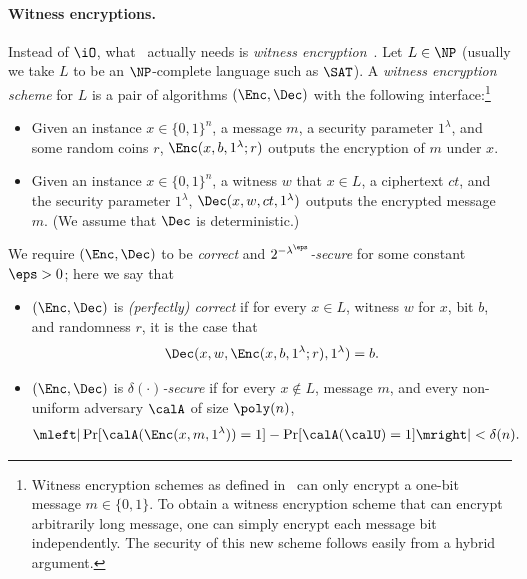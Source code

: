 \paragraph{Witness encryptions.} Instead of $\iO$, what~\cite{DBLP:conf/stoc/IlangoLW23} actually needs is \emph{witness encryption}~\cite{GargGSW13}. Let $L\in \NP$ (usually we take $L$ to be an $\NP$-complete language such as $\SAT$). A \emph{witness encryption scheme} for $L$ is a pair of algorithms $(\Enc, \Dec)$ with the following interface:\footnote{Witness encryption schemes as defined in~\cite{GargGSW13} can only encrypt a one-bit message $m\in \{0, 1\}$. To obtain a witness encryption scheme that can encrypt arbitrarily long message, one can simply encrypt each message bit independently. The security of this new scheme follows easily from a hybrid argument.}
\begin{itemize}
	\item Given an instance $x \in \{0, 1\}^n$, a message $m$, a security parameter $1^\lambda$, and some random coins $r$, $\Enc(x, b, 1^\lambda; r)$ outputs the encryption of $m$ under $x$.
	\item Given an instance $x \in \{0, 1\}^n$, a witness $w$ that $x\in L$, a ciphertext $ct$, and the security parameter $1^\lambda$, $\Dec(x, w, ct, 1^\lambda)$ outputs the encrypted message $m$. (We assume that $\Dec$ is deterministic.)
\end{itemize}

We require $(\Enc, \Dec)$ to be \emph{correct} and \emph{$2^{-\lambda^\eps}$-secure} for some constant $\eps > 0$; here we say that
\begin{itemize}
    \item $(\Enc, \Dec)$ is \emph{(perfectly) correct} if for every $x\in L$, witness $w$ for $x$, bit $b$, and randomness $r$, it is the case that 
    \[\Dec(x, w, \Enc(x, b, 1^\lambda; r), 1^\lambda) = b.\]
    \item $(\Enc, \Dec)$ is \emph{$\delta(\cdot)$-secure} if for every $x\not\in L$, message $m$, and every non-uniform adversary $\calA$ of size $\poly(n)$,
    \[\mleft|\Pr[\calA(\Enc(x, m, 1^\lambda)) = 1] - \Pr[\calA(\calU) = 1]\mright| < \delta(n).\]
\end{itemize}


